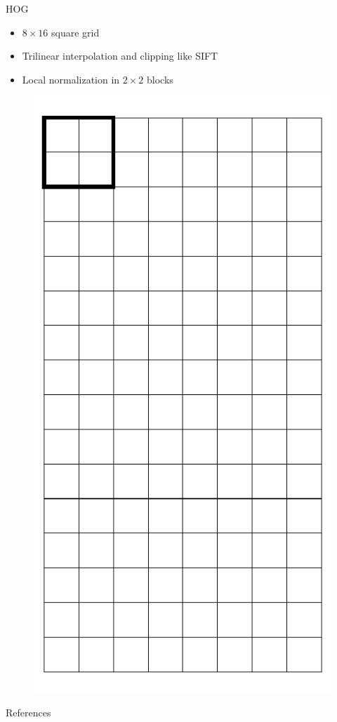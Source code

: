 \documentclass[14pt,t]{beamer}
\begin{document}
%
\begin{frame}{HOG \cite{dalal2005histograms}}
\ghostframe
\begin{minipage}[t]{0.7\textwidth}
	\begin{itemize}
	\item $8 \times 16$ square grid
	\item Trilinear interpolation and clipping like SIFT
	\item Local normalization in $2 \times 2$ blocks
	\end{itemize}
\end{minipage}
\begin{minipage}[t]{0.25\textwidth}
	\begin{figure}
		\includegraphics[width=\textwidth]{img/hogGrid.pdf}
	\end{figure}
\end{minipage}
\end{frame}
%
\begin{frame}{References}
\ghostframe
\printbibliography
\end{frame}
%
\end{document}
